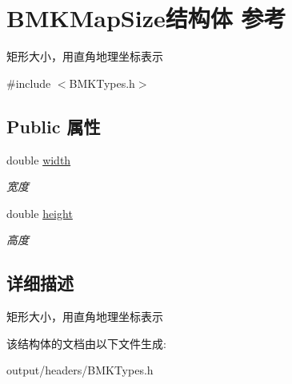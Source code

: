 \hypertarget{struct_b_m_k_map_size}{}\section{B\+M\+K\+Map\+Size结构体 参考}
\label{struct_b_m_k_map_size}


矩形大小，用直角地理坐标表示  




{\ttfamily \#include $<$B\+M\+K\+Types.\+h$>$}

\subsection*{Public 属性}
\begin{DoxyCompactItemize}
\item 
\hypertarget{struct_b_m_k_map_size_a1005d7fd59045a80619c024df3156d6a}{}double \hyperlink{struct_b_m_k_map_size_a1005d7fd59045a80619c024df3156d6a}{width}\label{struct_b_m_k_map_size_a1005d7fd59045a80619c024df3156d6a}

\begin{DoxyCompactList}\small\item\em 宽度 \end{DoxyCompactList}\item 
\hypertarget{struct_b_m_k_map_size_a516baff78187bf8f07ef49f01c7d86fc}{}double \hyperlink{struct_b_m_k_map_size_a516baff78187bf8f07ef49f01c7d86fc}{height}\label{struct_b_m_k_map_size_a516baff78187bf8f07ef49f01c7d86fc}

\begin{DoxyCompactList}\small\item\em 高度 \end{DoxyCompactList}\end{DoxyCompactItemize}


\subsection{详细描述}
矩形大小，用直角地理坐标表示 

该结构体的文档由以下文件生成\+:\begin{DoxyCompactItemize}
\item 
output/headers/B\+M\+K\+Types.\+h\end{DoxyCompactItemize}
